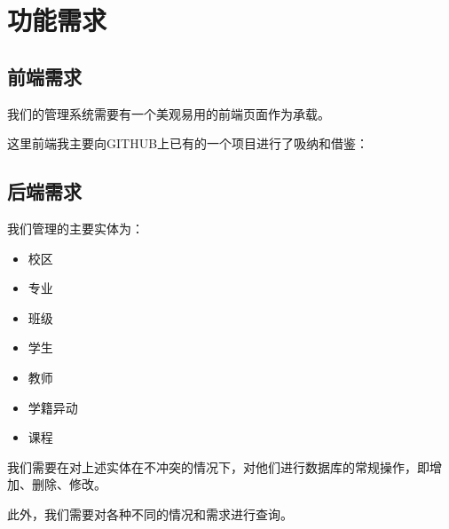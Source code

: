 \documentclass[../report.tex]{subfiles}
\begin{document}
\section {功能需求}

\subsection {前端需求}
我们的管理系统需要有一个美观易用的前端页面作为承载。

这里前端我主要向GITHUB上已有的一个项目进行了吸纳和借鉴：


\subsection {后端需求}
我们管理的主要实体为：

\begin{itemize}
\itemsep -0.3em
\item 校区
\item 专业
\item 班级
\item 学生
\item 教师
\item 学籍异动
\item 课程
\end{itemize}

我们需要在对上述实体在不冲突的情况下，对他们进行数据库的常规操作，即增加、删除、修改。

此外，我们需要对各种不同的情况和需求进行查询。
\end{document}
